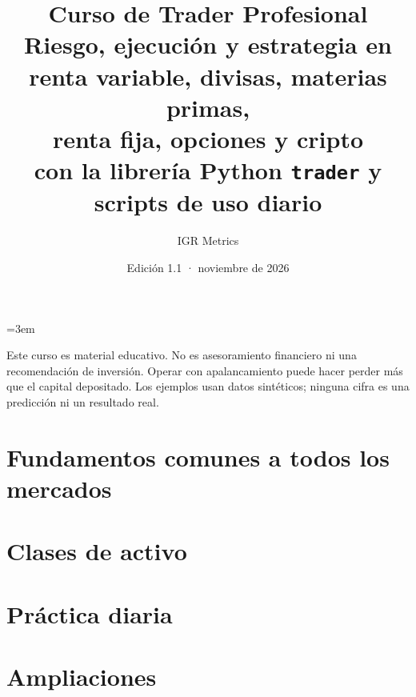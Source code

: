 \documentclass[11pt,a4paper,openany]{book}
\title{\Huge\bfseries Curso de Trader Profesional\\[6pt]
\Large Riesgo, ejecución y estrategia en renta variable, divisas, materias primas,\\ renta fija, opciones y cripto\\[14pt]
\normalsize con la librería Python \texttt{trader} y scripts de uso diario}
\author{IGR Metrics}
\date{Edición 1.1 · noviembre de 2026}
\begin{document}
\sloppy\emergencystretch=3em
\frontmatter
\maketitle
\begin{tcolorbox}[colback=white,colframe=black!50,title=Aviso]
Este curso es material educativo. No es asesoramiento financiero ni una recomendación de inversión.
Operar con apalancamiento puede hacer perder más que el capital depositado. Los ejemplos usan datos
sintéticos; ninguna cifra es una predicción ni un resultado real.
\end{tcolorbox}
\tableofcontents
\mainmatter

\part{Fundamentos comunes a todos los mercados}






\part{Clases de activo}






\part{Práctica diaria}


\part{Ampliaciones}

\appendix


\backmatter

\end{document}
